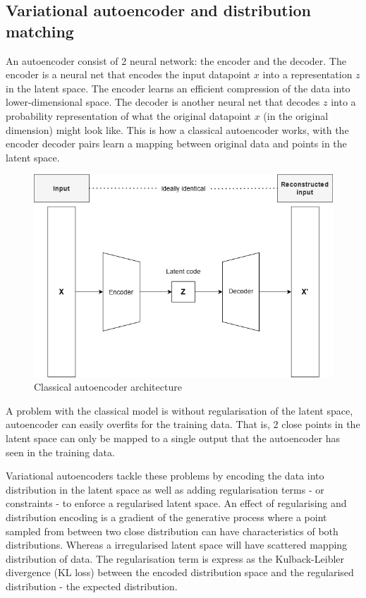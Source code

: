 \documentclass[12pt]{report}
\begin{document}
\subsection{Variational autoencoder and distribution matching}
An autoencoder consist of 2 neural network: the encoder and the decoder.
The encoder is a neural net that encodes the input datapoint $x$ into a representation $z$ in the latent space. The encoder learns an efficient compression of the data into lower-dimensional space.
The decoder is another neural net that decodes $z$ into a probability representation of what the original datapoint $x$ (in the original dimension) might look like.
This is how a classical autoencoder works, with the encoder decoder pairs learn a mapping between original data and points in the latent space.

\begin{figure}[h]
	\centering
	\includegraphics[scale=0.7]{autoencoder-architecture}
	\caption{Classical autoencoder architecture \cite{autoencoder}}
	\label{fig:autoencoder-architecture}
\end{figure}

A problem with the classical model is without regularisation of the latent space, autoencoder can easily overfits for the training data. That is, 2 close points in the latent space can only be mapped to a single output that the autoencoder has seen in the training data.

Variational autoencoders tackle these problems by encoding the data into distribution in the latent space as well as adding regularisation terms - or constraints - to enforce a regularised latent space. An effect of regularising and distribution encoding is a gradient of the generative process where a point sampled from between two close distribution can have characteristics of both distributions. Whereas a irregularised latent space will have scattered mapping distribution of data. The regularisation term is express as the Kulback-Leibler divergence (KL loss) \cite{kl-divergence} between the encoded distribution space and the regularised distribution - the expected distribution. 
\end{document}
